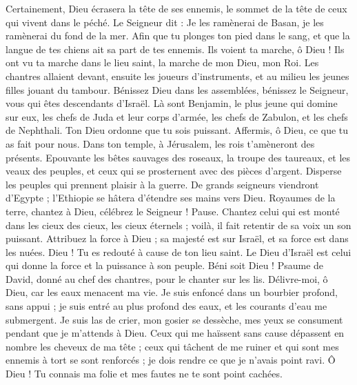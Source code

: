 \begin{multicols}{2}
Certainement, Dieu écrasera la tête de ses ennemis, le sommet de la tête de ceux qui vivent dans le péché.
Le Seigneur dit : Je les ramènerai de Basan, je les ramènerai du fond de la mer.
Afin que tu plonges ton pied dans le sang, et que la langue de tes chiens ait sa part de tes ennemis.
Ils voient ta marche, ô Dieu ! Ils ont vu ta marche dans le lieu saint, la marche de mon Dieu, mon Roi.
Les chantres allaient devant, ensuite les joueurs d'instruments, et au milieu les jeunes filles jouant du tambour.
Bénissez Dieu dans les assemblées, bénissez le Seigneur, vous qui êtes descendants d'Israël.
Là sont Benjamin, le plus jeune qui domine sur eux, les chefs de Juda et leur corps d’armée, les chefs de Zabulon, et les chefs de Nephthali.
Ton Dieu ordonne que tu sois puissant. Affermis, ô Dieu, ce que tu as fait pour nous.
Dans ton temple, à Jérusalem, les rois t'amèneront des présents.
Epouvante les bêtes sauvages des roseaux, la troupe des taureaux, et les veaux des peuples, et ceux qui se prosternent avec des pièces d'argent. Disperse les peuples qui prennent plaisir à la guerre.
De grands seigneurs viendront d'Egypte ; l’Ethiopie se hâtera d'étendre ses mains vers Dieu.
Royaumes de la terre, chantez à Dieu, célébrez le Seigneur ! Pause.
Chantez celui qui est monté dans les cieux des cieux, les cieux éternels ; voilà, il fait retentir de sa voix un son puissant.
Attribuez la force à Dieu ; sa majesté est sur Israël, et sa force est dans les nuées.
Dieu ! Tu es redouté à cause de ton lieu saint. Le Dieu d'Israël est celui qui donne la force et la puissance à son peuple. Béni soit Dieu !
\VerseOne{}Psaume de David, donné au chef des chantres, pour le chanter sur les lis.
Délivre-moi, ô Dieu, car les eaux menacent ma vie.
Je suis enfoncé dans un bourbier profond, sans appui ; je suis entré au plus profond des eaux, et les courants d’eau me submergent.
Je suis las de crier, mon gosier se dessèche, mes yeux se consument pendant que je m’attends à Dieu.
Ceux qui me haïssent sans cause dépassent en nombre les cheveux de ma tête ; ceux qui tâchent de me ruiner et qui sont mes ennemis à tort se sont renforcés ; je dois rendre ce que je n'avais point ravi.
Ô Dieu ! Tu connais ma folie et mes fautes ne te sont point cachées.

\end{multicols}
